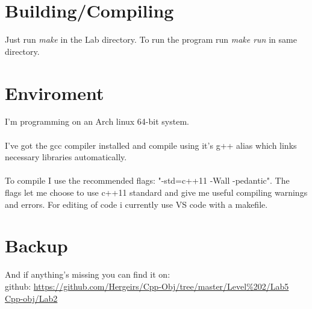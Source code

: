 \documentclass[11pt]{article}
\begin{document}
\section{Building/Compiling}
Just run \emph{make} in the Lab directory.
To run the program run \emph{make run} in same directory.

\section{Enviroment}
I'm programming on an Arch linux 64-bit system. \\ \\
I've got the gcc compiler installed and compile using it's g++ alias which links necessary libraries automatically. \\ \\
To compile I use the recommended flags: "-std=c++11 -Wall -pedantic". The flags let me choose to use c++11 standard and give me useful compiling warnings and errors. 
For editing of code i currently use VS code with a makefile.

\section{Backup}
And if anything's missing you can find it on: \\
github: \url{https://github.com/Hergeirs/Cpp-Obj/tree/master/Level%202/Lab5} \\
\href{https://github.com/Hergeirs/Cpp-Obj/tree/master/Level%202/Lab5}{Cpp-obj/Lab2}

\flushright{\today}
\end{document}
